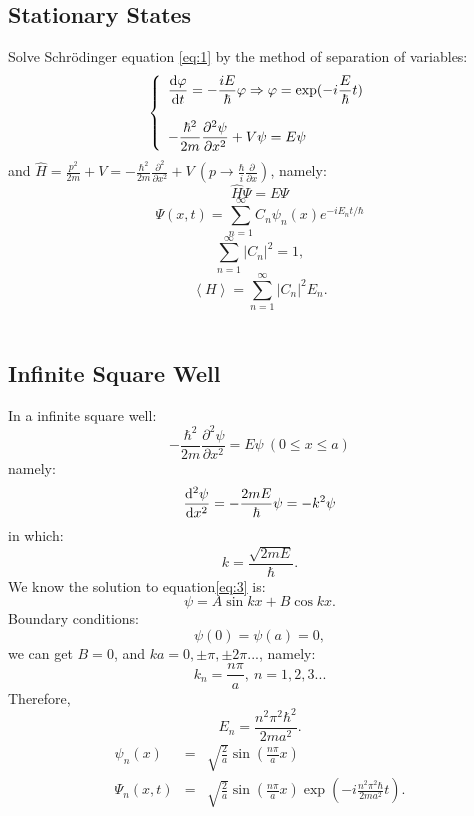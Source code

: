 \documentclass[12pt, 
]{article}
\begin{document}
	\subsection{Stationary States}
	Solve Schr\"odinger equation \eqref{eq:1} by the method of separation of variables:
		\[
		\left\{
			\begin{array}{l}
				\displaystyle\frac{{\rm d}\varphi}{{\rm d}t}=-\frac{iE}{\hbar}\varphi\Rightarrow\varphi=\exp(-i\frac{E}{\hbar}t)\\	
				~\\
				\displaystyle-\frac{\hbar^2}{2m}\frac{\partial^2\psi}{\partial x^2}+V\psi=E\psi
			\end{array}
		\right.
		\]	
	and $\displaystyle\hat{H}=\frac{p^2}{2m}+V=-\frac{\hbar^2}{2m}\frac{\partial^2}{\partial x^2}+V~(p\rightarrow\frac{\hbar}{i}\frac{\partial}{\partial x})$, namely:
	\begin{equation}\label{eq:2}
		\hat{H}\varPsi=E\varPsi			
	\end{equation}
	\[
		\varPsi(x,t)=\sum^{\infty}_{n=1}C_n \psi_n(x)e^{-iE_n t/\hbar}
	\]
	\begin{equation}
		\sum_{n=1}^{\infty}\left |C_n\right|^2 =1,
	\end{equation}
	\begin{equation}
		\left<H\right>=\sum_{n=1}^\infty\left|C_n\right|^2E_n.
	\end{equation}
	~\\

	\subsection{Infinite Square Well}
	In a infinite square well:
	\[
		-\frac{\hbar^2}{2m}\frac{\partial^2\psi}{\partial x^2}=E\psi~(0\leqslant x \leqslant a)
	\]
	namely:
	\begin{equation}\label{eq:3}
		\frac{\rm{d^2}\psi}{{\rm d}x^2}=-\frac{2mE}{\hbar}\psi=-k^2\psi 
	\end{equation}
	in which:
	\[
		k=\frac{\sqrt{2mE}}{\hbar}			
	.\]
	We know the solution to equation\eqref{eq:3} is:
	\begin{equation}
		\psi=A\sin kx+B\cos kx.
	\end{equation}
	Boundary conditions:$$\psi(0)=\psi(a)=0,$$we can get $B=0$, and $ka=0,\pm\pi, \pm2\pi...$, namely:
	\[
		k_n=\frac{n\pi}{a},~n=1,2,3...
	\]
	Therefore,$$E_n=\frac{n^2\pi^2\hbar^2}{2ma^2}.$$
	\begin{eqnarray}
		\psi_n(x)&=&\sqrt{\frac{2}{a}}\sin\left (\frac{n\pi}{a}x\right)\\
		\varPsi_n(x,t)&=&\sqrt{\frac{2}{a}}\sin \left (\frac{n\pi}{a}x\right)\exp \left (-i\frac{n^2\pi^2\hbar}{2ma^2}t\right).
	\end{eqnarray}
	~\\
\end{document}
